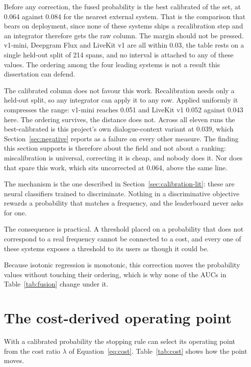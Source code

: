 Before any correction, the fused probability is the best calibrated of the set, at 0.064
against 0.084 for the nearest external system. That is the comparison that bears on
deployment, since none of these systems ships a recalibration step and an integrator
therefore gets the raw column. The margin should not be pressed. v1-mini, Deepgram Flux and LiveKit v1 are all within 0.03,
the table rests on a single held-out split of 214 spans, and no interval is attached to any
of these values. The ordering among the four leading systems is not a result this
dissertation can defend.

The calibrated column does not favour this work. Recalibration needs only a held-out split,
so any integrator can apply it to any row. Applied uniformly it compresses the range:
v1-mini reaches 0.051 and LiveKit v1 0.052 against 0.043 here. The ordering survives, the
distance does not. Across all eleven runs the best-calibrated is this project's own
dialogue-context variant at 0.039, which Section~\ref{sec:negative} reports as a failure on
every other measure. The finding this section supports is therefore about the field and not
about a ranking: miscalibration is universal, correcting it is cheap, and nobody does it.
Nor does that spare this work, which sits uncorrected at 0.064, above the same line.

The mechanism is the one described in Section~\ref{sec:calibration-lit}: these are neural classifiers trained to
discriminate. Nothing in a discriminative objective rewards a probability that matches a
frequency, and the leaderboard never asks for one. 

The consequence is practical. A threshold
placed on a probability that does not correspond to a real frequency cannot be connected to
a cost, and every one of these systems exposes a threshold to its users as though it could
be.

Because isotonic regression is monotonic, this correction moves the probability values
without touching their ordering, which is why none of the AUCs in
Table~\ref{tab:fusion} change under it.

\section{The cost-derived operating point}
\label{sec:costresults}

With a calibrated probability the stopping rule can select its operating point from the
cost ratio $\lambda$ of Equation~\ref{eq:cost}. Table~\ref{tab:cost} shows how the point
moves.

